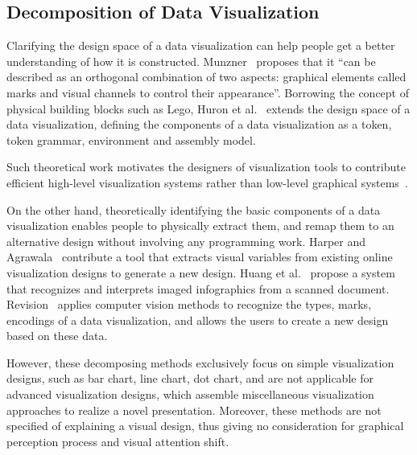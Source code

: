 \subsection{Decomposition of Data Visualization}
Clarifying the design space of a data visualization can help people get a better understanding of how it is constructed. Munzner~\cite{munzner_visualization_2014} proposes that it ``can be described as an orthogonal combination of two aspects: graphical elements called marks and visual channels to control their appearance''. Borrowing the concept of physical building blocks such as Lego, Huron et al.~\cite{huron_constructive_2014} extends the design space of a data visualization, defining the components of a data visualization as a token, token grammar, environment and assembly model.

Such theoretical work motivates the designers of visualization tools to contribute efficient high-level visualization systems rather than low-level graphical systems~\cite{bostock_protovis:_2009,mendez_ivolver:_2016}. 

On the other hand, theoretically identifying the basic components of a data visualization enables people to physically extract them, and remap them to an alternative design without involving any programming work. Harper and Agrawala~\cite{harper_deconstructing_2014} contribute a tool that extracts visual variables from existing online visualization designs to generate a new design. Huang et al.~\cite{Huang:2007:SUI:1284420.1284427} propose a system that recognizes and interprets imaged
infographics from a scanned document. Revision~\cite{savva_revision:_2011} applies computer vision methods to recognize the types, marks, encodings of a data visualization, and allows the users to create a new design based on these data. 

However, these decomposing methods exclusively focus on simple visualization designs, such as bar chart, line chart, dot chart, and are not applicable for advanced visualization designs, which assemble miscellaneous visualization approaches to realize a novel presentation. Moreover, these methods are not specified of explaining a visual design, thus giving no consideration for graphical perception process and visual attention shift. 

